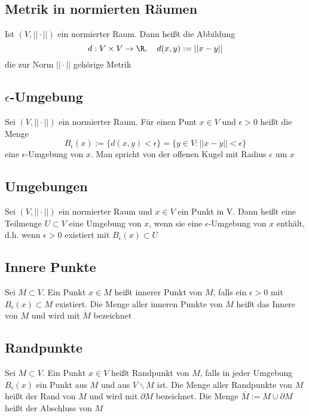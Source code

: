 	\subsection{Metrik in normierten Räumen}
		\begin{Definition} [ Metrik]
			Ist $(V,||\cdot||)$ ein normierter Raum. Dann heißt die Abbildung
			$$
				d: V \times V \to \R, \quad d(x, y):=||x-y||
			$$
			die zur Norm $||\cdot||$ gehörige Metrik
		\end{Definition}
	\subsection{$\epsilon$-Umgebung}
		\begin{Definition} 
			Sei $(V, ||\cdot||)$ ein normierter Raum. Für einen Punt $x\in V$ und $\epsilon>0$ heißt die Menge
			$$
				B_\epsilon(x):= \{d(x, y) < \epsilon\} = \{y\in V:||x-y||<\epsilon\}
			$$
			eine $\epsilon$-Umgebung von $x$. Man spricht von der offenen Kugel mit Radius $\epsilon$ um $x$
		\end{Definition}
	\subsection{Umgebungen}
		\begin{Definition} [ Umgebung]
			Sei $(V, ||\cdot||)$ ein normierter Raum und $x\in V$ ein Punkt in V. Dann heißt eine Teilmenge $U\subset V$ eine Umgebung von $x$, wenn sie eine $\epsilon$-Umgebung von $x$ enthält, d.h. wenn $\epsilon > 0$ existiert mit $B_\epsilon(x)\subset U$
		\end{Definition}
	\subsection{Innere Punkte}
		\begin{Definition} 
			Sei $M\subset V$. Ein Punkt $x\in M$ heißt innerer Punkt von $M$, falls ein $\epsilon>0$ mit $B_\epsilon(x)\subset M$ existiert. \newline
			Die Menge aller inneren Punkte von $M$ heißt das Innere von $M$ und wird mit $\mathring{M}$ bezeichnet
		\end{Definition}
	\subsection{Randpunkte}
		\begin{Definition} [ Randpunkt]
			Sei $M\subset V$. Ein Punkt $x\in V$ heißt Randpunkt von $M$, falls in jeder Umgebung $B_\epsilon(x)$ ein Punkt aus $M$ und aus $V\backslash M$ ist. \newline
			Die Menge aller Randpunkte von $M$ heißt der Rand von $M$ und wird mit $\partial M$ bezeichnet. \newline
			Die Menge $\overline{M}:=M\cup\partial M$ heißt der Abschluss von $M$
		\end{Definition}
